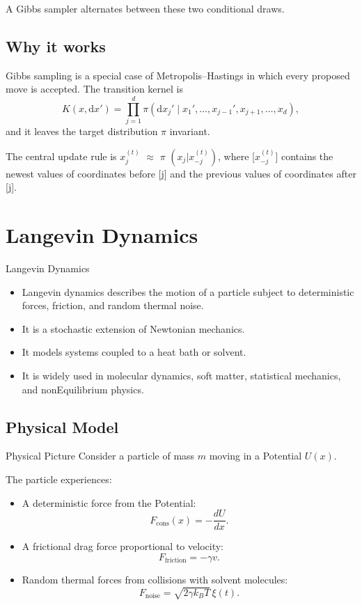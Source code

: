 \documentclass[a4paper, 10pt, onepage]{elegantbook}
\begin{document}
{A Gibbs sampler alternates between these two conditional draws.

\subsection{Why it works}

Gibbs sampling is a special case of Metropolis--Hastings in which every proposed
move is accepted. The transition kernel is
\[
K(x,\mathrm dx')
=
\prod_{j=1}^d
\pi\!\left(\mathrm dx_j'\mid x_1',\ldots,x_{j-1}',x_{j+1},\ldots,x_d\right),
\]
and it leaves the target distribution \(\pi\) invariant.

The central update rule is $x_j^{(t)}$ $\approx$ $\pi$ $\left( x_j \vert x_{-j}^(t) \right)$, 
where [$x_{-j}^{(t)}$] contains the newest values of coordinates before [j] and the previous values of coordinates 
after [j].

\newpage

\section{Langevin Dynamics}

\begin{frame}{Langevin Dynamics}
  \begin{itemize}
    \item Langevin dynamics describes the motion of a particle subject to deterministic forces, friction, and random 
thermal noise.
    \item It is a stochastic extension of Newtonian mechanics.
    \item It models systems coupled to a heat bath or solvent.
    \item It is widely used in molecular dynamics, soft matter, statistical mechanics, and nonEquilibrium physics.
  \end{itemize}
\end{frame}

\subsection{Physical Model}

\begin{frame}{Physical Picture}
  Consider a particle of mass \(m\) moving in a Potential \(U(x)\).

  The particle experiences:
  \begin{itemize}
    \item A deterministic force from the Potential:
    \[
      F_{\mathrm{cons}}(x)=-\frac{dU}{dx}.
    \]
    \item A frictional drag force proportional to velocity:
    \[
      F_{\mathrm{friction}}=-\gamma v.
    \]
    \item Random thermal forces from collisions with solvent molecules:
    \[
      F_{\mathrm{noise}}=\sqrt{2\gamma k_BT}\,\xi(t).
    \]
  \end{itemize}
\end{frame}

}
\end{document}
